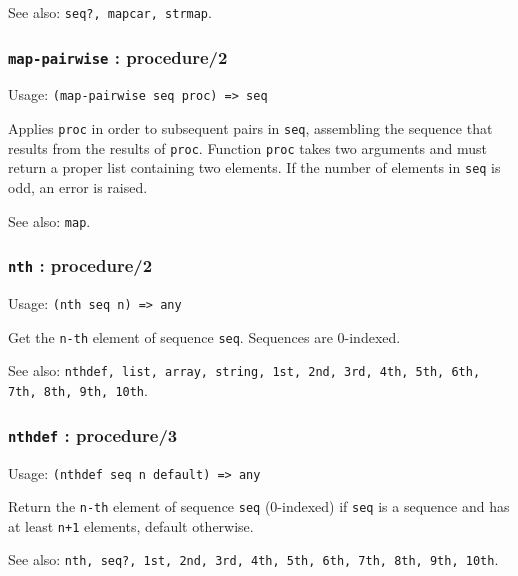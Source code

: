 \documentclass[
]{article}
\newcommand{\passthrough}[1]{#1}
\begin{document}
See also: \passthrough{\lstinline!seq?, mapcar, strmap!}.

\hypertarget{map-pairwise-procedure2}{%
\subsubsection{\texorpdfstring{\texttt{map-pairwise} :
procedure/2}{map-pairwise : procedure/2}}\label{map-pairwise-procedure2}}

Usage: \passthrough{\lstinline!(map-pairwise seq proc) => seq!}

Applies \passthrough{\lstinline!proc!} in order to subsequent pairs in
\passthrough{\lstinline!seq!}, assembling the sequence that results from
the results of \passthrough{\lstinline!proc!}. Function
\passthrough{\lstinline!proc!} takes two arguments and must return a
proper list containing two elements. If the number of elements in
\passthrough{\lstinline!seq!} is odd, an error is raised.

See also: \passthrough{\lstinline!map!}.

\hypertarget{nth-procedure2}{%
\subsubsection{\texorpdfstring{\texttt{nth} :
procedure/2}{nth : procedure/2}}\label{nth-procedure2}}

Usage: \passthrough{\lstinline!(nth seq n) => any!}

Get the \passthrough{\lstinline!n-th!} element of sequence
\passthrough{\lstinline!seq!}. Sequences are 0-indexed.

See also:
\passthrough{\lstinline!nthdef, list, array, string, 1st, 2nd, 3rd, 4th, 5th, 6th, 7th, 8th, 9th, 10th!}.

\hypertarget{nthdef-procedure3}{%
\subsubsection{\texorpdfstring{\texttt{nthdef} :
procedure/3}{nthdef : procedure/3}}\label{nthdef-procedure3}}

Usage: \passthrough{\lstinline!(nthdef seq n default) => any!}

Return the \passthrough{\lstinline!n-th!} element of sequence
\passthrough{\lstinline!seq!} (0-indexed) if
\passthrough{\lstinline!seq!} is a sequence and has at least
\passthrough{\lstinline!n+1!} elements, default otherwise.

See also:
\passthrough{\lstinline!nth, seq?, 1st, 2nd, 3rd, 4th, 5th, 6th, 7th, 8th, 9th, 10th!}.
\end{document}
